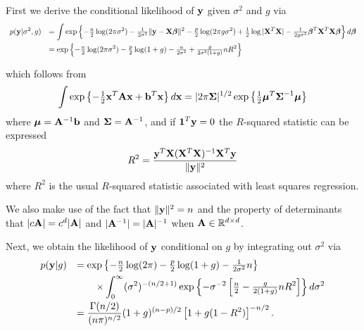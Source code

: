 \documentclass{amsart}[12pt]
\begin{document}
 
\noindent First we derive the conditional likelihood of ${\bf y}$ given $\sigma^2$ and $g$ via
$$
\begin{array}{rl}
	\displaystyle p({\bf y}|\sigma^2,g) 
	  & \displaystyle = \int \exp\left\{ 
	-\tfrac{n}{2}\log(2\pi\sigma^2) - \tfrac{1}{2\sigma^2}\|{\bf y} - {\bf X}{\boldsymbol \beta}\|^2
	-\tfrac{p}{2}\log(2\pi g\sigma^2) + \tfrac{1}{2}\log|{\bf X}^T{\bf X}| - \tfrac{1}{2g\sigma^2}{\boldsymbol \beta}^T{\bf X}^T{\bf X}{\boldsymbol \beta}
	\right\} d{\boldsymbol \beta}
	\\ [2ex]
	  & \displaystyle = \exp\left\{      
	-\tfrac{n}{2}\log(2\pi\sigma^2) 
	- \tfrac{p}{2}\log(1+g)
	- \tfrac{n}{2\sigma^2} 
	+ \tfrac{g}{2\sigma^2(1+g)} n R^2
	\right\}
\end{array}
$$

\noindent which follows from
\begin{equation}\label{res:01}
	\int \exp\left\{ -\tfrac{1}{2}{\bf x}^T{\bf A}{\bf x} + {\bf b}^T{\bf x} \right\} d {\bf x} = |2\pi{\boldsymbol\Sigma}|^{1/2} \exp\left\{ \tfrac{1}{2}{\boldsymbol \mu}^T{\boldsymbol \Sigma}^{-1}{\boldsymbol \mu} \right\}
\end{equation}
where ${\boldsymbol \mu} = {\bf A}^{-1}{\bf b}$ and ${\boldsymbol \Sigma} = {\bf A}^{-1}$, and if ${\bf 1}^T{\bf y}=0$ the $R$-squared statistic can be 
expressed
\begin{equation} \label{res:02}
	R^2 = \frac{{\bf y}^T{\bf X}({\bf X}^T{\bf X})^{-1}{\bf X}^T{\bf y}}{\|{\bf y}\|^2}
\end{equation}
where $R^2$ is the usual $R$-squared statistic associated with least squares regression.

We also make use of the fact that $\|{\bf y}\|^2 = n$ and the property of determinants that $|c{\bf A}| = c^d|{\bf A}|$ and $|{\bf A}^{-1}| = |{\bf A}|^{-1}$ when ${\bf A} \in{\mathbb R}^{d\times d}$.


\noindent Next, we obtain the likelihood of ${\bf y}$ conditional on $g$ by integrating out $\sigma^2$ via
$$
\begin{array}{rl}
	\displaystyle p({\bf y}|g) 
	  & \displaystyle = \exp\left\{                                                                                 
	- \tfrac{n}{2}\log(2\pi) - \tfrac{p}{2}\log(1+g) 
	- \tfrac{1}{2\sigma^2}n
	\right\}
	\\ [1ex]
	  & \displaystyle \qquad \times                                                                                 
	\int_0^\infty (\sigma^2)^{-(n/2 + 1)}
	\exp\left\{
	- \sigma^{-2} \left[ \tfrac{n}{2} - \tfrac{g}{2(1+g)} nR^2 \right] 
	\right\} d\sigma^2
	\\ [2ex]
	  & \displaystyle = \frac{\Gamma(n/2)}{(n\pi)^{n/2}} (1 + g)^{(n-p)/2} \left[  1 + g(1 -  R^2) \right] ^{-n/2}. 
\end{array}
$$
\end{document}
